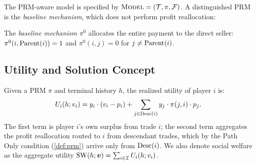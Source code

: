 The PRM-aware model is specified by $\textsc{Model} = (\mathcal{T}, \pi, \mathcal{F})$.
A distinguished PRM is the \emph{baseline mechanism}, which does not perform profit reallocation:

\begin{definition}
\label{def:baseline}
The \emph{baseline mechanism} $\pi^0$ allocates the entire payment to the direct seller: $\pi^0(i, \operatorname{Parent}(i)) = 1$ and $\pi^0(i, j) = 0$ for $j \neq \operatorname{Parent}(i)$.
\end{definition}


\subsection{Utility and Solution Concept}
\label{subsec:solution}

Given a PRM $\pi$ and terminal history $h$, the realized utility of player $i$ is:
\begin{equation}
\label{eq:utility-raw}
U_i(h; v_i) = y_i \cdot (v_i - p_i) + \sum_{j \in \operatorname{Desc}(i)} y_j \cdot \pi(j,i) \cdot p_j.
\end{equation}
The first term is player $i$'s own surplus from trade $i$; the second term aggregates the profit reallocation routed to $i$ from descendant trades, which by the Path Only condition (\cref{def:prm}) arrive only from $\operatorname{Desc}(i)$. We also denote social welfare as the aggregate utility $\mathrm{SW}(h;{\bm{v}}) = \sum_{i \in \mathcal{I}} U_i(h;v_i)$.

